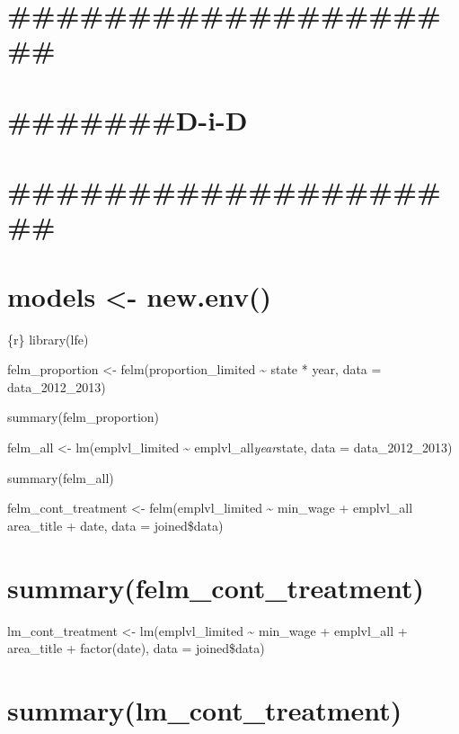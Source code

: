 \documentclass[
]{article}
\begin{document}
\hypertarget{section-2}{%
\section{\#\#\#\#\#\#\#\#\#\#\#\#\#\#\#\#\#\#\#\#}\label{section-2}}

\hypertarget{d-i-d}{%
\section{\#\#\#\#\#\#\#D-i-D}\label{d-i-d}}

\hypertarget{section-3}{%
\section{\#\#\#\#\#\#\#\#\#\#\#\#\#\#\#\#\#\#\#\#}\label{section-3}}

\hypertarget{models---new.env}{%
\section{models \textless- new.env()}\label{models---new.env}}

\{r\} library(lfe)

felm\_proportion \textless- felm(proportion\_limited \textasciitilde{}
state * year, data = data\_2012\_2013)

summary(felm\_proportion)

felm\_all \textless- lm(emplvl\_limited \textasciitilde{}
emplvl\_all\emph{year}state, data = data\_2012\_2013)

summary(felm\_all)

felm\_cont\_treatment \textless- felm(emplvl\_limited \textasciitilde{}
min\_wage + emplvl\_all \textbar{} area\_title + date, data =
joined\$data)

\hypertarget{summaryfelm_cont_treatment}{%
\section{summary(felm\_cont\_treatment)}\label{summaryfelm_cont_treatment}}

lm\_cont\_treatment \textless- lm(emplvl\_limited \textasciitilde{}
min\_wage + emplvl\_all + area\_title + factor(date), data =
joined\$data)

\hypertarget{summarylm_cont_treatment}{%
\section{summary(lm\_cont\_treatment)}\label{summarylm_cont_treatment}}
\end{document}
